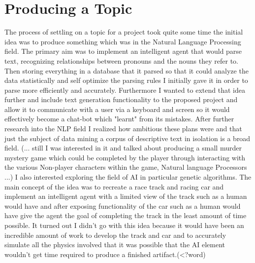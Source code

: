 \documentclass{report}
\begin{document}
\section{Producing a Topic}
The process of settling on a topic for a project took quite some time the initial idea was to produce something which was in the Natural Language Processing field. The primary aim was to implement an intelligent agent that would parse text, recognizing relationships between pronouns and the nouns they refer to. Then storing everything in a database that it parsed so that it could analyze the data statistically and self optimize the parsing rules I initially gave it in order to parse more efficiently and accurately. Furthermore I wanted to extend that idea further and include text generation functionality to the proposed project and allow it to communicate with a user via a keyboard and screen so it would effectively become a chat-bot which "learnt" from its mistakes. After further research into the NLP field I realized how ambitious these plans were and that just the subject of data mining a corpus of descriptive text in isolation is a broad field. (... still I was interested in it and talked about producing a small murder mystery game which could be completed by the player through interacting with the various Non-player characters within the game, Natural language Processors ...) I also interested exploring the field of AI in particular genetic algorithms. The main concept of the idea was to recreate a race track and racing car and implement an intelligent agent with a limited view of the track such as a human would have and after exposing functionality of the car such as a human would have give the agent the goal of completing the track in the least amount of time possible. It turned out I didn't go with this idea because it would have been an incredible amount of work to develop the track and car and to accurately simulate all the physics involved that it was possible that the AI element wouldn't get time required to produce a finished artifact.(<?word)
\end{document}
